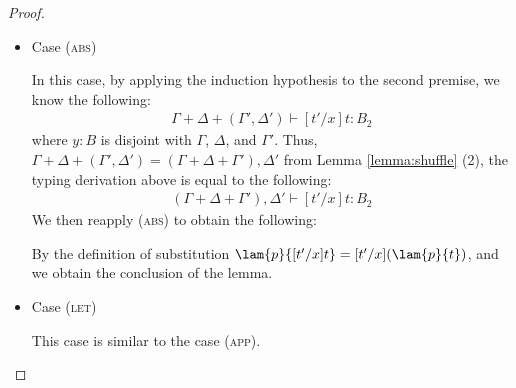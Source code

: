 \begin{proof}
\begin{itemize}
\item Case (\textsc{abs})
\begin{center}
    \begin{minipage}{.75\linewidth}
    \end{minipage}
\end{center}
In this case, by applying the induction hypothesis to the second premise, we know the following:
\begin{align*}
    \Gamma + \Delta + (\Gamma', \Delta') \vdash [t'/x]t : B_2
\end{align*}
where $y:B$ is disjoint with $\Gamma$, $\Delta$, and $\Gamma'$.
Thus, $\Gamma + \Delta + (\Gamma', \Delta') = (\Gamma + \Delta + \Gamma'), \Delta'$ from Lemma \ref{lemma:shuffle} (2), the typing derivation above is equal to the following:
\begin{align*}
    (\Gamma + \Delta + \Gamma'), \Delta' \vdash [t'/x]t : B_2
\end{align*}
We then reapply (\textsc{abs}) to obtain the following:
\begin{center}
    \begin{minipage}{.75\linewidth}
    \end{minipage}
\end{center}
By the definition of substitution $\lam{p}{[t'/x]t}=[t'/x](\lam{p}{t})$, and we obtain the conclusion of the lemma.
\\


\item Case (\textsc{let})
\begin{center}
    \begin{minipage}{.75\linewidth}
    \end{minipage}
\end{center}
This case is similar to the case (\textsc{app}).
\\


\end{itemize}
\end{proof}
